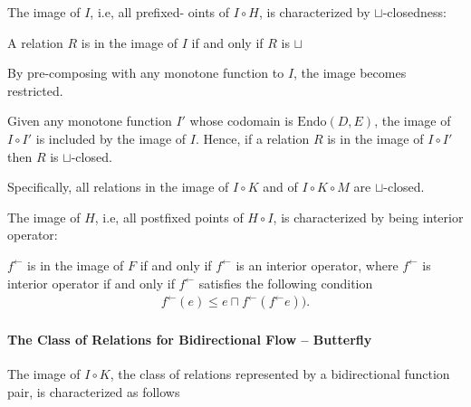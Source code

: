 \documentclass{llncs}
\newcommand{\Endo}{\mathrm{Endo}}
\newcommand{\fb}{{f^{\leftarrow}}}
\newcommand{\join}{\sqcup}
\newcommand{\comp}{\circ}
\begin{document}
  The image of $I$, i.e, all prefixed- oints of $I \comp H$, is characterized by $\join$-closedness:
  \begin{theorem}\label{thm:join-closed}
    A relation $R$ is in the image of $I$ if and only if $R$ is $\join$ 
  \end{theorem}

  By pre-composing with any monotone function to $I$, the image becomes restricted.
  \begin{proposition} \label{pr:restriction-subset}
    Given any monotone function $I'$ whose codomain is $\Endo(D, E)$, the image of $I \comp I'$ is included by the image of $I$.
    Hence, if a relation $R$ is in the image of $I \comp I'$ then $R$ is $\join$-closed.
  \end{proposition}
  Specifically, all relations in the image of $I \comp K$ and of $I \comp K \comp M$ are $\join$-closed.

  The image of $H$, i.e, all postfixed points of $H \comp I$, is characterized by being interior operator:
  \begin{proposition}\label{prop:interior-op}
  $\fb$ is in the image of $F$ if and only if $\fb$ is an interior operator,
  where $\fb$ is interior operator if and only if $\fb$ satisfies the following condition
  \begin{align*}
    \fb(e) \leq  e \sqcap \fb (\fb e)).
  \end{align*}
  \end{proposition}

  \paragraph{The Class of Relations for Bidirectional Flow -- Butterfly}
  The image of $I \comp K$, the class of relations represented by a bidirectional function pair, is characterized as follows
\end{document}
